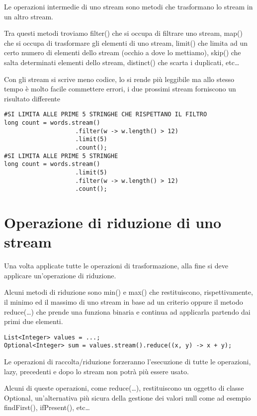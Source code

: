 Le operazioni intermedie di uno stream sono metodi che trasformano lo stream in un altro stream.

Tra questi metodi troviamo filter() che si occupa di filtrare uno stream, map() che si occupa di trasformare gli elementi di uno stream, limit() che limita ad un
certo numero di elementi dello stream (occhio a dove lo mettiamo), skip() che salta determinati elementi dello stream, distinct() che scarta i duplicati, etc\dots

Con gli stream si scrive meno codice, lo si rende più leggibile ma allo stesso tempo è molto facile commettere errori, i due prossimi stream forniscono un risultato 
differente

\begin{lstlisting}
#SI LIMITA ALLE PRIME 5 STRINGHE CHE RISPETTANO IL FILTRO
long count = words.stream()
                    .filter(w -> w.length() > 12)
                    .limit(5)
                    .count();
#SI LIMITA ALLE PRIME 5 STRINGHE                    
long count = words.stream()
                    .limit(5)
                    .filter(w -> w.length() > 12)
                    .count();
\end{lstlisting}

\section{Operazione di riduzione di uno stream}

Una volta applicate tutte le operazioni di trasformazione, alla fine si deve applicare un’operazione di riduzione.

Alcuni metodi di riduzione sono min() e max() che restituiscono, rispettivamente, il minimo ed il massimo di uno stream in base ad un criterio oppure il metodo reduce(\dots)
che prende una funziona binaria e continua ad applicarla partendo dai primi due elementi.
\begin{lstlisting}
List<Integer> values = ...;
Optional<Integer> sum = values.stream().reduce((x, y) -> x + y);
\end{lstlisting}

Le operazioni di raccolta/riduzione forzeranno l’esecuzione di tutte le operazioni, lazy, precedenti e dopo lo stream non potrà più essere usato.

Alcuni di queste operazioni, come reduce(\dots), restituiscono un oggetto di classe Optional, un’alternativa più sicura della gestione dei valori null come ad esempio findFirst(), 
ifPresent(), etc\dots

